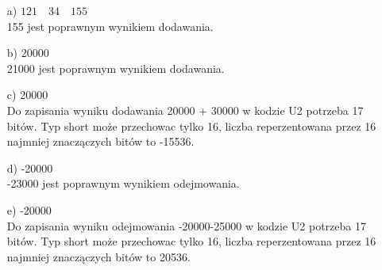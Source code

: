 \documentclass[a4paper, 11pt]{article}
\begin{document}
\begin{enumerate}
	\item [a)] $121 \quad 34 \quad 155$ \\
	      155 jest poprawnym wynikiem dodawania.
	\item[b)] 20000   \\
	      21000 jest poprawnym wynikiem dodawania.
	\item[c)] 20000   \\
	      Do zapisania wyniku dodawania 20000 + 30000 w kodzie U2 potrzeba 17 bitów. Typ short może przechowac tylko 16, liczba reperzentowana przez 16 najmniej znaczączych bitów to -15536.
	\item[d)] -20000   \\
	      -23000 jest poprawnym wynikiem odejmowania.
	\item[e)]  -20000   \\
	      Do zapisania wyniku odejmowania -20000-25000 w kodzie U2 potrzeba 17 bitów. Typ short może przechowac tylko 16, liczba reperzentowana przez 16 najmniej znaczączych bitów to 20536.

\end{enumerate}

\end{document}
